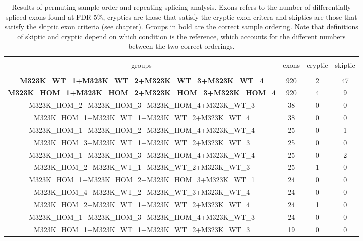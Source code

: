 \begin{appendices}
\begin{figure}
	\label{fig:RNAmap_splicing}
\end{figure}



\begin{table}[!htbp] \centering 
	
	\footnotesize
	\caption{Results of permuting sample order and repeating splicing analysis. Exons refers to the number of differentially spliced exons found at FDR 5\%, cryptics are those that satisfy the cryptic exon critera and skiptics are those that satisfy the skiptic exon criteria (see chapter). Groups in bold are the correct sample ordering. Note that definitions of skiptic and cryptic depend on which condition is the reference, which accounts for the different numbers between the two correct orderings. } 
	\label{append:permutations} 
	\begin{tabular}{@{\extracolsep{5pt}} cccc} 
		\\[-1.8ex]\hline 
		\hline \\[-1.8ex] 
		groups & exons & cryptic & skiptic \\ 
		\hline \\[-1.8ex] 
		\textbf{M323K\_WT\_1+M323K\_WT\_2+M323K\_WT\_3+M323K\_WT\_4} & 920 & 2 & 47 \\ 
		\textbf{M323K\_HOM\_1+M323K\_HOM\_2+M323K\_HOM\_3+M323K\_HOM\_4} & 920 & 4 & 9 \\ 
		M323K\_HOM\_2+M323K\_HOM\_3+M323K\_HOM\_4+M323K\_WT\_3 & 38 & 0 & 0 \\ 
		M323K\_HOM\_1+M323K\_WT\_1+M323K\_WT\_2+M323K\_WT\_4 & 38 & 0 & 0 \\ 
		M323K\_HOM\_1+M323K\_HOM\_2+M323K\_HOM\_4+M323K\_WT\_4 & 25 & 0 & 1 \\ 
		M323K\_HOM\_3+M323K\_WT\_1+M323K\_WT\_2+M323K\_WT\_3 & 25 & 0 & 0 \\ 
		M323K\_HOM\_1+M323K\_HOM\_3+M323K\_HOM\_4+M323K\_WT\_4 & 25 & 0 & 2 \\ 
		M323K\_HOM\_2+M323K\_WT\_1+M323K\_WT\_2+M323K\_WT\_3 & 25 & 1 & 0 \\ 
		M323K\_HOM\_1+M323K\_HOM\_2+M323K\_HOM\_3+M323K\_WT\_1 & 24 & 0 & 0 \\ 
		M323K\_HOM\_4+M323K\_WT\_2+M323K\_WT\_3+M323K\_WT\_4 & 24 & 0 & 0 \\ 
		M323K\_HOM\_2+M323K\_WT\_1+M323K\_WT\_2+M323K\_WT\_4 & 24 & 1 & 0 \\ 
		M323K\_HOM\_1+M323K\_HOM\_3+M323K\_HOM\_4+M323K\_WT\_3 & 24 & 0 & 0 \\ 
		M323K\_HOM\_1+M323K\_WT\_1+M323K\_WT\_2+M323K\_WT\_3 & 19 & 0 & 0 \\ 

\end{tabular}
\end{table}
\end{appendices}
